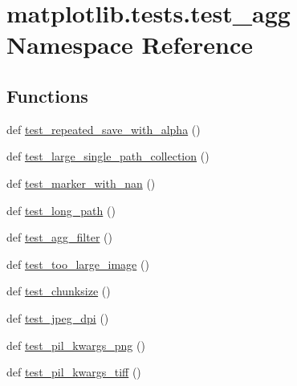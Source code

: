\hypertarget{namespacematplotlib_1_1tests_1_1test__agg}{}\section{matplotlib.\+tests.\+test\+\_\+agg Namespace Reference}
\label{namespacematplotlib_1_1tests_1_1test__agg}
\subsection*{Functions}
\begin{DoxyCompactItemize}
\item 
def \hyperlink{namespacematplotlib_1_1tests_1_1test__agg_affd30ff3307afbf5e033af1f54ebba91}{test\+\_\+repeated\+\_\+save\+\_\+with\+\_\+alpha} ()
\item 
def \hyperlink{namespacematplotlib_1_1tests_1_1test__agg_a00b644b938b07d55b4739a357ab9f576}{test\+\_\+large\+\_\+single\+\_\+path\+\_\+collection} ()
\item 
def \hyperlink{namespacematplotlib_1_1tests_1_1test__agg_a058c524e45d8308f54cce3429885038e}{test\+\_\+marker\+\_\+with\+\_\+nan} ()
\item 
def \hyperlink{namespacematplotlib_1_1tests_1_1test__agg_a8f43b5412bfca6e0cdcf3ec018041256}{test\+\_\+long\+\_\+path} ()
\item 
def \hyperlink{namespacematplotlib_1_1tests_1_1test__agg_a46248d37f0f024c81d958bb5be119e0e}{test\+\_\+agg\+\_\+filter} ()
\item 
def \hyperlink{namespacematplotlib_1_1tests_1_1test__agg_aa674eee496b56b701fb734a1e81b291e}{test\+\_\+too\+\_\+large\+\_\+image} ()
\item 
def \hyperlink{namespacematplotlib_1_1tests_1_1test__agg_a85befbddd2b567496eee05c05ca620ef}{test\+\_\+chunksize} ()
\item 
def \hyperlink{namespacematplotlib_1_1tests_1_1test__agg_a5f7553439ad2d043985c22a9095721ab}{test\+\_\+jpeg\+\_\+dpi} ()
\item 
def \hyperlink{namespacematplotlib_1_1tests_1_1test__agg_ad10408797ec08032833ca79ccc1aa372}{test\+\_\+pil\+\_\+kwargs\+\_\+png} ()
\item 
def \hyperlink{namespacematplotlib_1_1tests_1_1test__agg_a0eab5fb58960fa9c9fbb0046b34bf1e6}{test\+\_\+pil\+\_\+kwargs\+\_\+tiff} ()
\end{DoxyCompactItemize}

